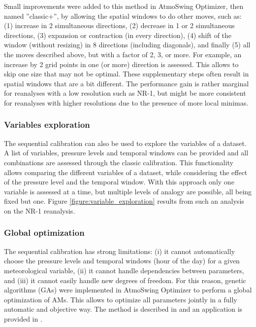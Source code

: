 \documentclass[review]{elsarticle}
\begin{document}
Small improvements were added to this method in AtmoSwing Optimizer, then named ''classic+'', by allowing the spatial windows to do other moves, such as: (1) increase in 2 simultaneous directions, (2) decrease in 1 or 2 simultaneous directions, (3) expansion or contraction (in every direction), (4) shift of the window (without resizing) in 8 directions (including diagonals), and finally (5) all the moves described above, but with a factor of 2, 3, or more. For example, an increase by 2 grid points in one (or more) direction is assessed. This allows to skip one size that may not be optimal. These supplementary steps often result in spatial windows that are a bit different. The performance gain is rather marginal for reanalyses with a low resolution such as NR-1, but might be more consistent for reanalyses with higher resolutions due to the presence of more local minimas.


\subsubsection{Variables exploration}
\label{sec:vars-explo}

The sequential calibration can also be used to explore the variables of a dataset. A list of variables, pressure levels and temporal windows can be provided and all combinations are assessed through the classic calibration. This functionality allows comparing the different variables of a dataset, while considering the effect of the pressure level and the temporal window. With this approach only one variable is assessed at a time, but multiple levels of analogy are possible, all being fixed but one. Figure \ref{figure:variable_exploration} results from such an analysis on the NR-1 reanalysis.


\subsubsection{Global optimization}
\label{sec:global-optimization}

The sequential calibration has strong limitations: (i) it cannot automatically choose the pressure levels and temporal windows (hour of the day) for a given meteorological variable, (ii) it cannot handle dependencies between parameters, and (iii) it cannot easily handle new degrees of freedom. For this reason, genetic algorithms (GAs) were implemented in AtmoSwing Optimizer to perform a global optimization of AMs. This allows to optimize all parameters jointly in a fully automatic and objective way. The method is described in \citet{Horton2017a} and an application is provided in \citet{Horton2018a}.
\end{document}
